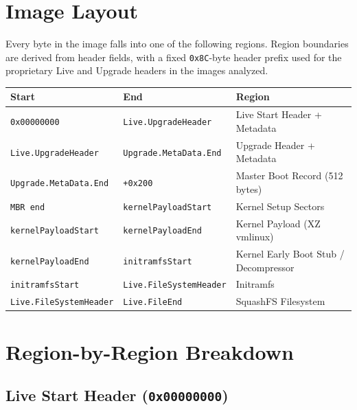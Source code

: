 \documentclass[11pt,a4paper]{article}
\begin{document}
\newpage
\section{Image Layout}

Every byte in the image falls into one of the following regions. Region
boundaries are derived from header fields, with a fixed \texttt{0x8C}-byte
header prefix used for the proprietary Live and Upgrade headers in the
images analyzed.

\begin{center}
\small
\begin{tabular}{l l l}
\toprule
\textbf{Start} & \textbf{End} & \textbf{Region} \\
\midrule
\texttt{0x00000000}          & \texttt{Live.UpgradeHeader}      & Live Start Header + Metadata \\
\texttt{Live.UpgradeHeader}  & \texttt{Upgrade.MetaData.End}    & Upgrade Header + Metadata \\
\texttt{Upgrade.MetaData.End}& \texttt{+0x200}                  & Master Boot Record (512 bytes) \\
\texttt{MBR end}             & \texttt{kernelPayloadStart}      & Kernel Setup Sectors \\
\texttt{kernelPayloadStart}  & \texttt{kernelPayloadEnd}        & Kernel Payload (XZ vmlinux) \\
\texttt{kernelPayloadEnd}    & \texttt{initramfsStart}          & Kernel Early Boot Stub / Decompressor \\
\texttt{initramfsStart}      & \texttt{Live.FileSystemHeader}   & Initramfs \\
\texttt{Live.FileSystemHeader} & \texttt{Live.FileEnd}          & SquashFS Filesystem \\
\bottomrule
\end{tabular}
\end{center}

\section{Region-by-Region Breakdown}

\subsection{Live Start Header (\texttt{0x00000000})}
\end{document}
